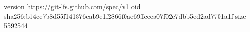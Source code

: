version https://git-lfs.github.com/spec/v1
oid sha256:b14ce7b8d55f141876cab9e1f2866f0ae69ffceea07f02e7dbb5ed2ad7701a1f
size 5592544
